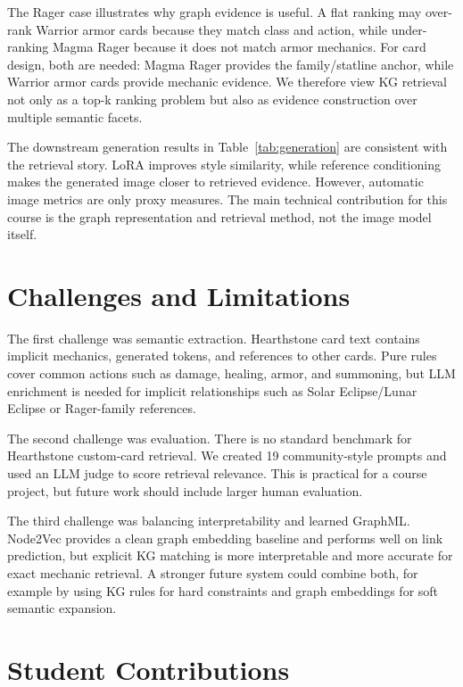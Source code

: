 \documentclass{article}
\begin{document}
The Rager case illustrates why graph evidence is useful. A flat ranking may over-rank Warrior armor cards because they match class and action, while under-ranking Magma Rager because it does not match armor mechanics. For card design, both are needed: Magma Rager provides the family/statline anchor, while Warrior armor cards provide mechanic evidence. We therefore view KG retrieval not only as a top-k ranking problem but also as evidence construction over multiple semantic facets.

The downstream generation results in Table~\ref{tab:generation} are consistent with the retrieval story. LoRA improves style similarity, while reference conditioning makes the generated image closer to retrieved evidence. However, automatic image metrics are only proxy measures. The main technical contribution for this course is the graph representation and retrieval method, not the image model itself.

\section{Challenges and Limitations}

The first challenge was semantic extraction. Hearthstone card text contains implicit mechanics, generated tokens, and references to other cards. Pure rules cover common actions such as damage, healing, armor, and summoning, but LLM enrichment is needed for implicit relationships such as Solar Eclipse/Lunar Eclipse or Rager-family references.

The second challenge was evaluation. There is no standard benchmark for Hearthstone custom-card retrieval. We created 19 community-style prompts and used an LLM judge to score retrieval relevance. This is practical for a course project, but future work should include larger human evaluation.

The third challenge was balancing interpretability and learned GraphML. Node2Vec provides a clean graph embedding baseline and performs well on link prediction, but explicit KG matching is more interpretable and more accurate for exact mechanic retrieval. A stronger future system could combine both, for example by using KG rules for hard constraints and graph embeddings for soft semantic expansion.

\section{Student Contributions}
\end{document}
